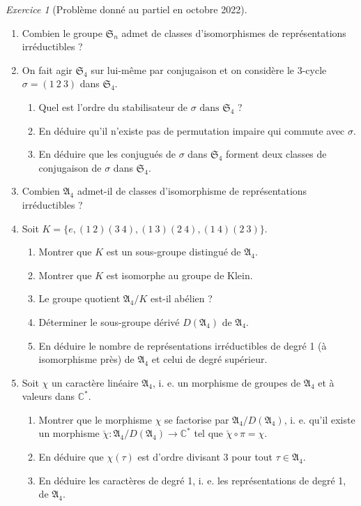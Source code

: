 \documentclass[french]{book}
\theoremstyle{definition}
\theoremstyle{remark}
\newtheorem{exo}{Exercice}
\begin{document}
\begin{exo}[Problème donné au partiel en octobre 2022]

  \

  \begin{enumerate}
    \item Combien le groupe \(\mathfrak{S}_n\) admet de classes d'isomorphismes de représentations irréductibles ?
    \item On fait agir \(\mathfrak{S}_{4}\) sur lui-même par conjugaison et on considère le 3-cycle \(\sigma = (1 \ 2 \ 3)\) dans \(\mathfrak{S}_{4}\).
    \begin{enumerate}
      \item Quel est l'ordre du stabilisateur de \(\sigma \text{ dans } \mathfrak{S}_{4}\) ?
      \item En déduire qu'il n'existe pas de permutation impaire qui commute avec \(\sigma\).
      \item En déduire que les conjugués de \(\sigma\) dans \(\mathfrak{S}_{4}\) forment deux classes de conjugaison de \(\sigma\) dans \(\mathfrak{S}_{4}\).
    \end{enumerate}
    \item Combien \(\mathfrak{A}_4\) admet-il de classes d'isomorphisme de représentations irréductibles ?
    \item Soit \(K = \{ e, (1 \ 2)(3 \ 4), (1 \ 3)(2 \ 4), (1 \ 4)(2 \ 3)\}\).
    \begin{enumerate}
      \item Montrer que \(K\) est un sous-groupe distingué de \(\mathfrak{A}_{4}\).
      \item Montrer que \(K\) est isomorphe au groupe de Klein.
      \item Le groupe quotient \(\mathfrak{A}_4/ K\) est-il abélien ?
      \item Déterminer le sous-groupe dérivé \(D(\mathfrak{A}_{4})\) de \(\mathfrak{A}_4\).
      \item En déduire le nombre de représentations irréductibles de degré 1 (à isomorphisme près) de \(\mathfrak{A}_4\) et celui de degré supérieur.
    \end{enumerate}

    \item {} Soit \(\chi\) un caractère linéaire \(\mathfrak{A}_4\), i. e. un morphisme de groupes de \(\mathfrak{A}_4\) et à valeurs dans \(\mathbb{C}^*\).

    \begin{enumerate}
      \item Montrer que le morphisme \(\chi\) se factorise par \(\mathfrak{A}_4 / D(\mathfrak{A}_4)\), i. e. qu'il existe un morphisme \(\check{\chi} : \mathfrak{A}_4 / D(\mathfrak{A}_4) \longrightarrow \mathbb{C}^{*}\) tel que \(\check{\chi} \circ \pi = \chi\).
      \item En déduire que \(\chi(\tau)\) est d'ordre divisant 3 pour tout \(\tau \in \mathfrak{A}_{4}\).
      \item En déduire les caractères de degré 1, i. e. les représentations de degré 1, de \(\mathfrak{A}_{4}\).
    \end{enumerate}


\end{enumerate}
\end{exo}
\end{document}
